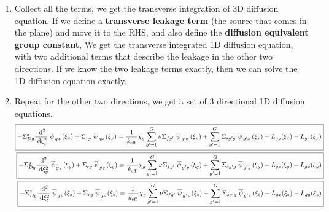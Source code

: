 \documentclass{school-22.211-notes}
\begin{document}
\begin{enumerate}
\item Collect all the terms, we get the transverse integration of 3D diffusion equation, 
  If we define a \textbf{transverse leakage term} (the source that comes in the plane) and move it to the RHS, 
  and also define the \textbf{diffusion equivalent group constant}, 
  We get the transverse integrated 1D diffusion equation, with two additional terms that describe the leakage in the other two directions. If we know the two leakage terms exactly, then we can solve the 1D diffusion equation exactly. 

\item Repeat for the other two directions, we get a set of 3 directional 1D diffusion equations.
  \begin{align}
    \boxed{ - \Sigma_{Dg}^x \frac{\mbox{ }\mathrm{d}^2}{\mbox{ }\mathrm{d} \xi_x^2} \left.\overline{\psi} \right._{gx} (\xi_x) + \Sigma_{rg} \left.\overline{\psi} \right._{gx} (\xi_x) = \frac{1}{\left. k_{\mathrm{eff}} \right.} \chi_g \displaystyle\sum_{g'=1}^G \nu \Sigma_{fg'} \left.\overline{\psi} \right._{g'x} (\xi_x) + \displaystyle\sum_{g'=1}^G \Sigma_{sg'g} \left.\overline{\psi} \right._{g'x} (\xi_x) - L_{gy} (\xi_x) - L_{gz} (\xi_x) } \notag \\
    \boxed{ - \Sigma_{Dg}^y \frac{\mbox{ }\mathrm{d}^2}{\mbox{ }\mathrm{d} \xi_y^2} \left.\overline{\psi} \right._{gy} (\xi_y) + \Sigma_{rg} \left.\overline{\psi} \right._{gy} (\xi_y) = \frac{1}{\left. k_{\mathrm{eff}} \right.} \chi_g \displaystyle\sum_{g'=1}^G \nu \Sigma_{fg'} \left.\overline{\psi} \right._{g'y} (\xi_y) + \displaystyle\sum_{g'=1}^G \Sigma_{sg'g} \left.\overline{\psi} \right._{g'y} (\xi_y) - L_{gz} (\xi_y) - L_{gx} (\xi_y) }  \notag \\
    \boxed{ - \Sigma_{Dg}^z \frac{\mbox{ }\mathrm{d}^2}{\mbox{ }\mathrm{d} \xi_z^2} \left.\overline{\psi} \right._{gz} (\xi_z) + \Sigma_{rg} \left.\overline{\psi} \right._{gz} (\xi_z) = \frac{1}{\left. k_{\mathrm{eff}} \right.} \chi_g \displaystyle\sum_{g'=1}^G \nu \Sigma_{fg'} \left.\overline{\psi} \right._{g'z} (\xi_z) + \displaystyle\sum_{g'=1}^G \Sigma_{sg'g} \left.\overline{\psi} \right._{g'z} (\xi_z) - L_{gx} (\xi_z) - L_{gy} (\xi_z) } \notag
  \end{align}


\end{enumerate}
\end{document}
